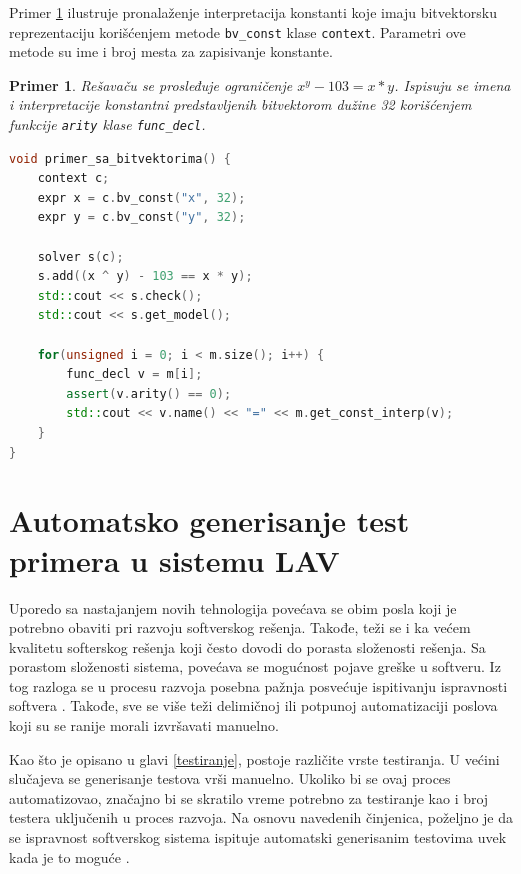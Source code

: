 \documentclass[12pt,oneside]{memoir}
\newtheorem{primer}{Primer}
\begin{document}
Primer \ref{ex6} ilustruje pronalaženje interpretacija konstanti koje imaju bitvektorsku reprezentaciju korišćenjem metode \texttt{bv\_const} klase \texttt{context}. Parametri ove metode su ime i broj mesta za zapisivanje konstante. 
\begin{primer} \label{ex6} 
Rešavaču se prosleđuje ograničenje $x^y - 103 = x*y$. 
Ispisuju se imena i interpretacije konstantni predstavljenih bitvektorom dužine 32 korišćenjem funkcije \texttt{arity} klase \texttt{func\_decl}.
\begin{lstlisting}[language=C++]
void primer_sa_bitvektorima() {
    context c;
    expr x = c.bv_const("x", 32);
    expr y = c.bv_const("y", 32);

    solver s(c);
    s.add((x ^ y) - 103 == x * y);
    std::cout << s.check();
    std::cout << s.get_model();
    
    for(unsigned i = 0; i < m.size(); i++) {
        func_decl v = m[i];
        assert(v.arity() == 0); 
        std::cout << v.name() << "=" << m.get_const_interp(v);
    }
}

\end{lstlisting}
\end{primer}



\chapter{Automatsko generisanje test primera u sistemu LAV} \label{implementacija}
Uporedo sa nastajanjem novih tehnologija povećava se obim posla koji je potrebno obaviti pri razvoju softverskog rešenja. Takođe, teži se i ka većem kvalitetu softerskog rešenja koji često dovodi do porasta složenosti rešenja. Sa porastom složenosti sistema, povećava se mogućnost pojave greške u softveru. Iz tog razloga se u procesu razvoja posebna pažnja posvećuje ispitivanju ispravnosti softvera \cite{Verification}. Takođe, sve se više teži delimičnoj ili potpunoj automatizaciji poslova koji su se ranije morali izvršavati manuelno. 
\par
Kao što je opisano u glavi \ref{testiranje}, postoje različite vrste testiranja. U većini slučajeva se generisanje testova vrši manuelno. Ukoliko bi se ovaj proces automatizovao, značajno bi se skratilo vreme potrebno za testiranje kao i broj testera uključenih u proces razvoja. 
Na osnovu navedenih činjenica, poželjno je da se ispravnost softverskog sistema ispituje automatski generisanim testovima uvek kada je to moguće \cite{AutomatedTestGeneration}.
\end{document}
